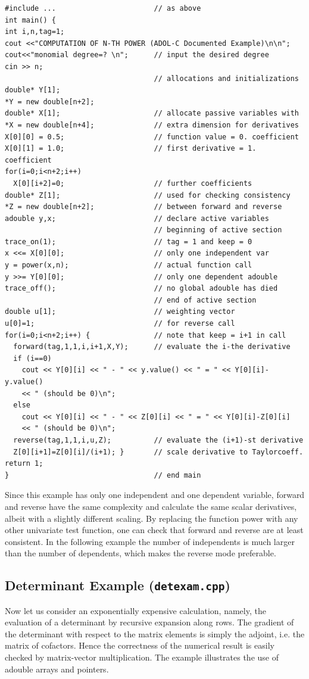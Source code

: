 \documentclass[11pt,twoside]{article}
\begin{document}
\begin{verbatim}
#include ...                       // as above
int main() {
int i,n,tag=1;
cout <<"COMPUTATION OF N-TH POWER (ADOL-C Documented Example)\n\n";
cout<<"monomial degree=? \n";      // input the desired degree
cin >> n;
                                   // allocations and initializations
double* Y[1];
*Y = new double[n+2];
double* X[1];                      // allocate passive variables with
*X = new double[n+4];              // extra dimension for derivatives
X[0][0] = 0.5;                     // function value = 0. coefficient
X[0][1] = 1.0;                     // first derivative = 1. coefficient
for(i=0;i<n+2;i++)
  X[0][i+2]=0;                     // further coefficients
double* Z[1];                      // used for checking consistency
*Z = new double[n+2];              // between forward and reverse
adouble y,x;                       // declare active variables
                                   // beginning of active section
trace_on(1);                       // tag = 1 and keep = 0
x <<= X[0][0];                     // only one independent var
y = power(x,n);                    // actual function call
y >>= Y[0][0];                     // only one dependent adouble
trace_off();                       // no global adouble has died
                                   // end of active section
double u[1];                       // weighting vector
u[0]=1;                            // for reverse call
for(i=0;i<n+2;i++) {               // note that keep = i+1 in call
  forward(tag,1,1,i,i+1,X,Y);      // evaluate the i-the derivative
  if (i==0)
    cout << Y[0][i] << " - " << y.value() << " = " << Y[0][i]-y.value() 
    << " (should be 0)\n";
  else
    cout << Y[0][i] << " - " << Z[0][i] << " = " << Y[0][i]-Z[0][i] 
    << " (should be 0)\n";
  reverse(tag,1,1,i,u,Z);          // evaluate the (i+1)-st derivative
  Z[0][i+1]=Z[0][i]/(i+1); }       // scale derivative to Taylorcoeff.
return 1;
}                                  // end main
\end{verbatim}
Since this example has only one independent and one dependent variable,
{\sf forward} and {\sf reverse} have the same complexity and calculate
the same scalar derivatives, albeit with a slightly different scaling.
By replacing the function {\sf power} with any other univariate test function,
one can check that {\sf forward} and {\sf reverse} are at least consistent.
In the following example the number of independents is much larger
than the number of dependents, which makes the reverse mode preferable.
%
\subsection{Determinant Example ({\tt detexam.cpp})}
%
Now let us consider an exponentially expensive calculation,
namely, the evaluation of a determinant by recursive expansion 
along rows. The gradient of the determinant with respect to the
matrix elements is simply the adjoint, i.e. the matrix of cofactors.
Hence the correctness of the numerical result is easily checked by
matrix-vector multiplication. The example illustrates the use
of {\sf adouble} arrays and pointers.  
\end{document}
